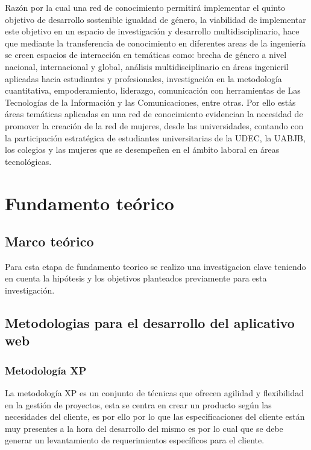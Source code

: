 \documentclass[hidelinks]{Documento}
\begin{document}
Razón por la cual una red de conocimiento permitirá implementar el quinto objetivo de desarrollo sostenible igualdad de género, la viabilidad de implementar este objetivo en un espacio de investigación y desarrollo multidisciplinario, hace que mediante la transferencia de conocimiento en diferentes areas de la ingeniería se creen espacios de interacción en temáticas como: brecha de género a nivel nacional, internacional y global, análisis multidisciplinario en áreas ingenieril aplicadas hacia estudiantes y profesionales, investigación en la metodología cuantitativa, empoderamiento, liderazgo, comunicación con herramientas de Las Tecnologías de la Información y las Comunicaciones, entre otras. Por ello estás áreas temáticas aplicadas en una red de conocimiento evidencian la necesidad de promover la creación de la red de mujeres, desde las universidades, contando con la participación estratégica de estudiantes universitarias de la UDEC, la UABJB, los colegios y las mujeres que se desempeñen en el ámbito laboral en áreas tecnológicas.

\chapter{Fundamento teórico}

\section{Marco teórico}

Para esta etapa de fundamento teorico se realizo una investigacion clave teniendo en cuenta la hipótesis y los objetivos planteados previamente para esta investigación.


\section{Metodologias para el desarrollo del aplicativo web}

\subsection{Metodología XP}

La metodología XP es un conjunto de técnicas que ofrecen agilidad y flexibilidad en la gestión de proyectos, esta se centra en crear un producto según las necesidades del cliente, es por ello por lo que las especificaciones del cliente están muy presentes a la hora del desarrollo del mismo es por lo cual que se debe generar un levantamiento de requerimientos específicos para el cliente.
\end{document}
